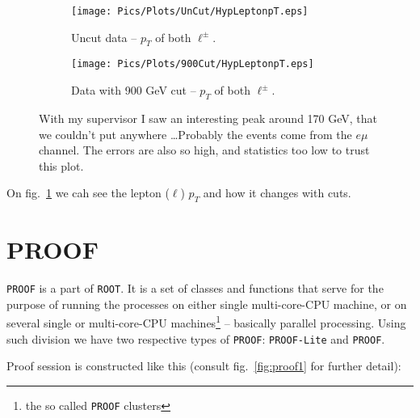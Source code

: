 \documentclass[a4paper, 12 pt, titlepage, twocolumn]{article}
\begin{document}
\begin{figure}[H]
	\centering
	\begin{subfigure}[b]{0.4\textwidth}\centering
	\texttt{[image: Pics/Plots/UnCut/HypLeptonpT.eps]}
	\caption{Uncut data -- $p_T$ of both $\ell^\pm$.}
	\end{subfigure}

	\begin{subfigure}[b]{0.4\textwidth}\centering
	\texttt{[image: Pics/Plots/900Cut/HypLeptonpT.eps]}
	\caption{Data with 900 GeV cut -- $p_T$ of both $\ell^\pm$.}
	\end{subfigure}

	\caption{With my supervisor I saw an interesting peak around 170 GeV, that we couldn't put anywhere
		\ldots Probably the events come from the $e\mu$ channel. The errors are also so high, and
		statistics too low to trust this plot.}
	\label{fig:lepptanal}
	\vspace{-12pt}
\end{figure}

On fig.~\ref{fig:lepptanal} we cah see the lepton ($\ell$) $p_T$ and how it changes with cuts.


\section{PROOF}

{\tt PROOF} is a part of {\tt ROOT}. It is a set of classes and functions that serve for the purpose of running
the processes on either single multi-core-CPU machine, or on several single or multi-core-CPU 
machines\footnote{the so called {\tt PROOF} clusters} -- basically parallel processing. Using such division
we have two respective types of {\tt PROOF}: {\tt PROOF-Lite} and {\tt PROOF}.

Proof session is constructed like this (consult fig.~\ref{fig:proof1} for further detail):
\end{document}
